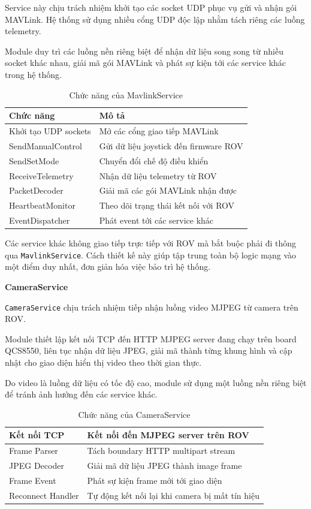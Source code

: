 \documentclass[../DoAn.tex]{subfiles}
\begin{document}
Service này chịu trách nhiệm khởi tạo các socket UDP phục vụ gửi và nhận
gói MAVLink. Hệ thống sử dụng nhiều cổng UDP độc lập nhằm tách riêng các
luồng telemetry.

Module duy trì các luồng nền riêng biệt để nhận dữ liệu song song từ
nhiều socket khác nhau, giải mã gói MAVLink và phát sự kiện tới các
service khác trong hệ thống.

\begin{table}[H]
\centering
\renewcommand{\arraystretch}{1.3}
\begin{tabular}{|l|p{9cm}|}
\hline
\textbf{Chức năng} & \textbf{Mô tả}\\
\hline
Khởi tạo UDP sockets &
Mở các cổng giao tiếp MAVLink\\
\hline
SendManualControl &
Gửi dữ liệu joystick đến firmware ROV\\
\hline
SendSetMode &
Chuyển đổi chế độ điều khiển\\
\hline
ReceiveTelemetry &
Nhận dữ liệu telemetry từ ROV\\
\hline
PacketDecoder &
Giải mã các gói MAVLink nhận được\\
\hline
HeartbeatMonitor &
Theo dõi trạng thái kết nối với ROV\\
\hline
EventDispatcher &
Phát event tới các service khác\\
\hline
\end{tabular}
\caption{Chức năng của MavlinkService}
\end{table}

Các service khác không giao tiếp trực tiếp với ROV mà bắt buộc phải đi
thông qua \texttt{MavlinkService}. Cách thiết kế này giúp tập trung toàn
bộ logic mạng vào một điểm duy nhất, đơn giản hóa việc bảo trì hệ thống.

\subsubsubsection\textbf{CameraService}

\texttt{CameraService} chịu trách nhiệm tiếp nhận luồng video MJPEG từ
camera trên ROV.

Module thiết lập kết nối TCP đến HTTP MJPEG server đang chạy trên board
QCS8550, liên tục nhận dữ liệu JPEG, giải mã thành từng khung hình và
cập nhật cho giao diện hiển thị video theo thời gian thực.

Do video là luồng dữ liệu có tốc độ cao, module sử dụng một luồng nền
riêng biệt để tránh ảnh hưởng đến các service khác.

\begin{table}[H]
\centering
\begin{tabular}{|l|p{9cm}|}
\hline
Kết nối TCP &
Kết nối đến MJPEG server trên ROV\\
\hline
Frame Parser &
Tách boundary HTTP multipart stream\\
\hline
JPEG Decoder &
Giải mã dữ liệu JPEG thành image frame\\
\hline
Frame Event &
Phát sự kiện frame mới tới giao diện\\
\hline
Reconnect Handler &
Tự động kết nối lại khi camera bị mất tín hiệu\\
\hline
\end{tabular}
\caption{Chức năng của CameraService}
\end{table}
\end{document}
